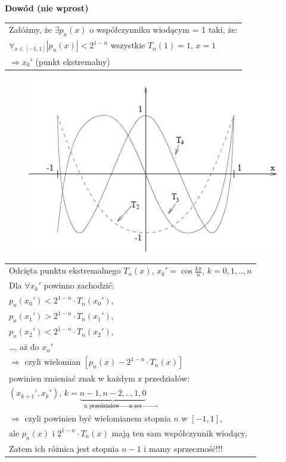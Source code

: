 \begin{frame}
	\textbf{Dowód (nie wprost) }\newline
	\begin{tabular}{|l}
		Załóżmy, że $\exists p_n(x)$ o współczynniku wiodącym = 1 taki, że:
      \\$\forall_{x \in [-1,1]}|p_n(x)| < 2^{1-n}$ wszystkie $T_n(1) = 1$, $x = 1$\\ $\Rightarrow x_0'$ (punkt ekstremalny) \\
	\end{tabular}	
    \begin{figure}
		\includegraphics[height=0.7\textheight]{img/5/dowod.jpg}
	\end{figure}
\end{frame}
\begin{frame}
	\begin{tabular}{|l}
		Odcięta punktu ekstremalnego $T_n(x)$, $x_k'=\cos\frac{k\pi}{n}$, $k=0,1,..,n$\\
        Dla $\forall x_k'$ powinno zachodzić: \\
        $p_n(x_0') < 2^{1-n} \cdot T_n(x_0')$, \\
        $p_n(x_1') > 2^{1-n} \cdot T_n(x_1')$, \\
        $p_n(x_2') < 2^{1-n} \cdot T_n(x_2')$, \\
        \ldots , aż do $x_n'$ \\
        $\Rightarrow$ czyli wielomian $[p_n(x) - 2^{1-n} \cdot T_n(x)]$ \\
        powinien zmieniać znak w każdym z przedziałów: \\
        $(x_{k+1}',x_k')$, $k = \underbrace{n-1, n-2,..,1,0}_{\text{n przedziałów $\rightarrow$ n zer}} $\\ 
         $\Rightarrow $ czyli powinien być wielomianem stopnia $n$ w $[-1,1]$, \\ 
         ale $p_n(x)$ i $2^{1-n} \cdot T_n(x)$ mają ten sam współczynnik wiodący, \\
         Zatem ich różnica jest stopnia $n-1$ i mamy sprzeczność!!!
	\end{tabular}
\end{frame}
